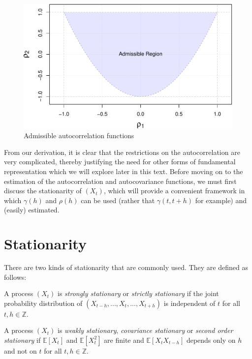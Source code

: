 \documentclass[]{book}
\theoremstyle{definition}
\theoremstyle{definition}
\theoremstyle{definition}
\theoremstyle{remark}
\let\BeginKnitrBlock\begin \let\EndKnitrBlock\end
\begin{document}
\begin{figure}

{\centering \includegraphics{ts_files/figure-latex/admissibility-1} 

}

\caption{Admissible autocorrelation functions}\label{fig:admissibility}
\end{figure}

From our derivation, it is clear that the restrictions on the
autocorrelation are very complicated, thereby justifying the need for
other forms of fundamental representation which we will explore later in
this text. Before moving on to the estimation of the autocorrelation and
autocovariance functions, we must first discuss the stationarity of
\((X_t)\), which will provide a convenient framework in which
\(\gamma(h)\) and \(\rho(h)\) can be used (rather that \(\gamma(t,t+h)\)
for example) and (easily) estimated.

\section{Stationarity}\label{stationary}

There are two kinds of stationarity that are commonly used. They are
defined as follows:

\BeginKnitrBlock{definition}
\protect\hypertarget{def:strongstationarity}{}{\label{def:strongstationarity}
}A process \((X_t)\) is \emph{strongly stationary} or \emph{strictly
stationary} if the joint probability distribution of
\((X_{t-h}, ..., X_t, ..., X_{t+h})\) is independent of \(t\) for all
\(t,h \in \mathbb{Z}\).
\EndKnitrBlock{definition}

\BeginKnitrBlock{definition}
\protect\hypertarget{def:weakstationarity}{}{\label{def:weakstationarity} }A
process \((X_t)\) is \emph{weakly stationary}, \emph{covariance
stationary} or \emph{second order stationary} if \(\mathbb{E}[X_t]\) and
\(\mathbb{E}[X_t^2]\) are finite and \(\mathbb{E}[X_t X_{t-h}]\) depends
only on \(h\) and not on \(t\) for all \(t,h \in \mathbb{Z}\).
\EndKnitrBlock{definition}
\end{document}
